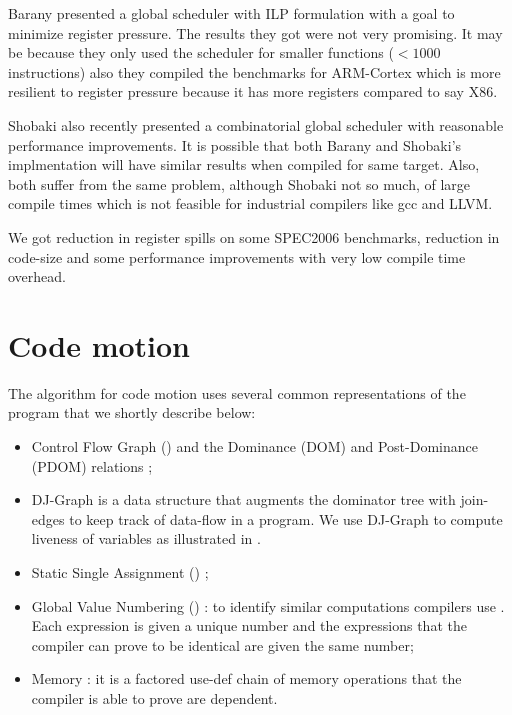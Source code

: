 \documentclass[acmlarge,review]{acmart}\settopmatter{printfolios=true}
\begin{document}
Barany \cite{barany2013} presented a global scheduler with ILP formulation with
a goal to minimize register pressure. The results they got were not very
promising. It may be because they only used the scheduler for smaller functions
($<1000$ instructions) also they compiled the benchmarks for ARM-Cortex which is
more resilient to register pressure because it has more registers compared to
say X86.

Shobaki \cite{shobaki2013} also recently presented a combinatorial global
scheduler with reasonable performance improvements. It is possible that both
Barany and Shobaki's implmentation will have similar results when compiled for
same target. Also, both suffer from the same problem, although Shobaki not so
much, of large compile times which is not feasible for industrial compilers like
gcc and LLVM.

We got reduction in register spills on some SPEC2006 benchmarks, reduction in
code-size and some performance improvements with very low compile time overhead.


\section{Code motion}

The algorithm for code motion uses several common representations of the
program that we shortly describe below:
\begin{itemize}
\item Control Flow Graph (\CFG{}) and the Dominance (DOM) and Post-Dominance (PDOM)
  relations \cite{dragonbook};
\item DJ-Graph \cite{Sreedhar1996} is a data structure that augments the
  dominator tree with join-edges to keep track of data-flow in a program. We use
  DJ-Graph to compute liveness of variables as illustrated in \cite{das2012}.
\item Static Single Assignment (\SSA{}) \cite{cytron};
\item Global Value Numbering (\GVN{}) \cite{rosen1988global,click1995global}: to
  identify similar computations compilers use \GVN{}.  Each expression is given
  a unique number and the expressions that the compiler can prove to be
  identical are given the same number;
\item Memory \SSA{} \cite{novillo2007memory}: it is a factored use-def chain of
  memory operations that the compiler is able to prove are dependent.
\end{itemize}
\end{document}
